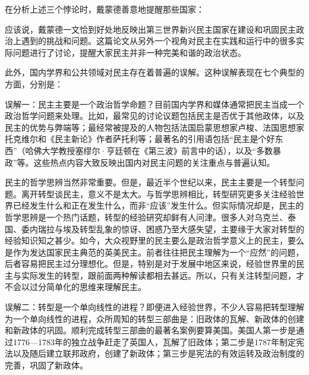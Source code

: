 在分析上述三个悖论时，戴蒙德善意地提醒那些国家：


应该说，戴蒙德一文恰到好处地反映出第三世界新兴民主国家在建设和巩固民主政治上遇到的挑战和问题。这篇论文从另外一个视角对民主在实践和运行中的很多实际问题进行了讨论，提醒大家民主并非一种完美和谐的政治状态。

此外，国内学界和公共领域对民主存在着普遍的误解。这种误解表现在七个典型的方面，分别是：

误解一：民主主要是一个政治哲学命题？目前国内学界和媒体通常把民主当成一个政治哲学问题来处理。比如，最常见的讨论议题包括民主是否优于其他政体，以及民主的优势与弊端等；最经常被提及的人物包括法国启蒙思想家卢梭、法国思想家托克维尔和《民主新论》作者萨托利等；最著名的引用语包括“民主是个好东西”（哈佛大学教授塞缪尔·亨廷顿在《第三波》前言中的话），以及“多数暴政”等。这些热点内容大致反映出国内对民主问题的关注重点与普遍认知。

民主的哲学思辨当然非常重要。但是，最近半个世纪以来，民主主要是一个转型问题。离开转型谈民主，意义不是太大。与哲学思辨相比，转型研究更多关注经验世界已经发生什么和正在发生什么，而非“应该”发生什么。但实际情况却是，民主的哲学思辨是一个热门话题，转型的经验研究却鲜有人问津。很多人对乌克兰、泰国、委内瑞拉与埃及转型乱象的惊讶、困惑乃至大感失望，主要缘于大家对转型的经验知识知之甚少。如今，大众视野里的民主要么是政治哲学意义上的民主，要么是作为发达国家民主典范的英美民主。前者往往把民主理解为一个“应然”的问题，后者容易把民主过分理想化。但是，特别是对于发展中地区来说，经验世界里的民主与实际发生的转型，跟前面两种解读都相去甚远。所以，只有关注转型问题，才不会以过分简单化的思维来理解民主。

误解二：转型是一个单向线性的进程？即便进入经验世界，不少人容易把转型理解为一个单向线性的进程，众所周知的转型三部曲是：旧政体的瓦解、新政体的创建和新政体的巩固。顺利完成转型三部曲的最著名案例要算美国。美国人第一步是通过1776—1783年的独立战争赶走了英国人，瓦解了旧政体；第二步是1787年制定宪法以及随后建立联邦政府，创建了新政体；第三步是宪法的有效运转及政治制度的完善，巩固了新政体。

